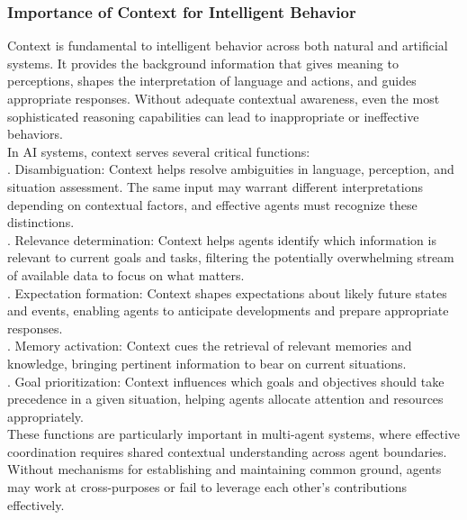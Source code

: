 \subsubsection{Importance of Context for Intelligent Behavior}
Context is fundamental to intelligent behavior across both natural and artificial systems. It provides the background information that gives meaning to perceptions, shapes the interpretation of language and actions, and guides appropriate responses. Without adequate contextual awareness, even the most sophisticated reasoning capabilities can lead to inappropriate or ineffective behaviors.\\ \newline
In AI systems, context serves several critical functions:\\ . Disambiguation: Context helps resolve ambiguities in language, perception, and situation assessment. The same input may warrant different interpretations depending on contextual factors, and effective agents must recognize these distinctions.\\ . Relevance determination: Context helps agents identify which information is relevant to current goals and tasks, filtering the potentially overwhelming stream of available data to focus on what matters.\\ . Expectation formation: Context shapes expectations about likely future states and events, enabling agents to anticipate developments and prepare appropriate responses.\\ . Memory activation: Context cues the retrieval of relevant memories and knowledge, bringing pertinent information to bear on current situations.\\ . Goal prioritization: Context influences which goals and objectives should take precedence in a given situation, helping agents allocate attention and resources appropriately.\\ \newline
These functions are particularly important in multi-agent systems, where effective coordination requires shared contextual understanding across agent boundaries. Without mechanisms for establishing and maintaining common ground, agents may work at cross-purposes or fail to leverage each other's contributions effectively.\\
